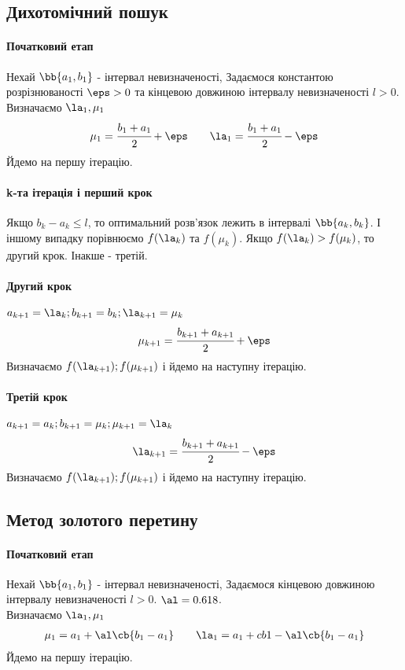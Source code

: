 \subsection{Дихотомічний пошук}
\paragraph{Початковий етап}
Нехай $\bb{a_1,b_1}$ - інтервал невизначеності, Задаємося константою розрізнюваності $\eps>0$ та кінцевою довжиною інтервалу невизначеності $l>0$.\\
Визначаємо $\la_1,\mu_1$
\begin{eqnarray}
	&\mu_1 = \cfrac{b_1+a_1}{2} + \eps\quad
	&\la_1 = \cfrac{b_1+a_1}{2} - \eps
\end{eqnarray}
Йдемо на першу ітерацію.
\paragraph{k-та ітерація і перший крок}
Якщо $b_k - a_k \leq l$, то оптимальний розв’язок лежить в інтервалі $\bb{a_k,b_k}$. І іншому випадку порівнюємо $f(\la_k)$ та $f(\mu_k)$. Якщо $f(\la_k)>f(\mu_k)$, то другий крок. Інакше - третій.
\paragraph{Другий крок}
$a_{k+1} = \la_k;b_{k+1} = b_k;\la_{k+1} = \mu_k$
\begin{equation}
	\mu_{k+1} = \cfrac{b_{k+1}+a_{k+1}}{2} + \eps
\end{equation}
Визначаємо $f(\la_{k+1});f(\mu_{k+1})$ і йдемо на наступну ітерацію. 
\paragraph{Третій крок}
$a_{k+1} = a_k;b_{k+1} = \mu_k; \mu_{k+1} = \la_k $
\begin{equation}
	\la_{k+1} = \cfrac{b_{k+1}+a_{k+1}}{2} - \eps
\end{equation}
Визначаємо $f(\la_{k+1});f(\mu_{k+1})$ і йдемо на наступну ітерацію.
\subsection{Метод золотого перетину}
\paragraph{Початковий етап}
Нехай $\bb{a_1,b_1}$ - інтервал невизначеності, Задаємося кінцевою довжиною інтервалу невизначеності $l>0$. $\al = 0.618$.\\
Визначаємо $\la_1,\mu_1$
\begin{eqnarray}
	&\mu_1 = a_1 + \al\cb{b_1 - a_1}\quad
	&\la_1 =  a_1 +	cb{1-\al}\cb{b_1 - a_1}
\end{eqnarray}
Йдемо на першу ітерацію.

